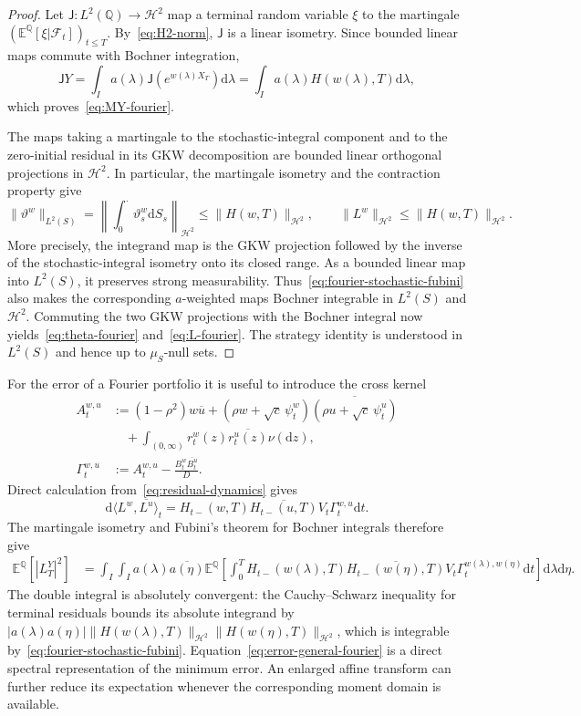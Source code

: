 \documentclass[11pt]{article}
\theoremstyle{definition}
\theoremstyle{remark}
\newcommand{\E}{\mathbb{E}}
\newcommand{\Q}{\mathbb{Q}}
\newcommand{\F}{\mathcal{F}}
\newcommand{\1}{\mathbf{1}}
\newcommand{\dd}{\mathrm{d}}
\begin{document}
\begin{proof}
Let $\mathsf J:L^2(\Q)\to\mathcal H^2$ map a terminal random variable $\xi$
to the martingale $(\E^\Q[\xi|\F_t])_{t\leq T}$. By~\eqref{eq:H2-norm},
$\mathsf J$ is a linear isometry. Since bounded linear
maps commute with Bochner integration,
\[
 \mathsf JY
 =\int_Ia(\lambda)\mathsf J(e^{w(\lambda)X_T})\dd\lambda
 =\int_Ia(\lambda)H(w(\lambda),T)\dd\lambda,
\]
which proves~\eqref{eq:MY-fourier}.

The maps taking a martingale to the stochastic-integral component and to the
zero-initial residual in its GKW decomposition are bounded linear orthogonal
projections in $\mathcal H^2$. In particular, the martingale isometry and the
contraction property give
\[
 \|\vartheta^{w}\|_{L^2(S)}
 =\left\|\int_0^\cdot\vartheta_s^{w}\dd S_s\right\|_{\mathcal H^2}
 \leq\|H(w,T)\|_{\mathcal H^2},
 \qquad
 \|L^{w}\|_{\mathcal H^2}
 \leq\|H(w,T)\|_{\mathcal H^2}.
\]
More precisely, the integrand map is the GKW projection followed by the
inverse of the stochastic-integral isometry onto its closed range. As a
bounded linear map into $L^2(S)$, it preserves strong measurability.
Thus~\eqref{eq:fourier-stochastic-fubini} also makes the corresponding
$a$-weighted maps Bochner integrable in $L^2(S)$ and $\mathcal H^2$.
Commuting the two GKW projections with the Bochner integral now
yields~\eqref{eq:theta-fourier} and~\eqref{eq:L-fourier}. The strategy
identity is understood in $L^2(S)$ and hence up to $\mu_S$-null sets.
\end{proof}

For the error of a Fourier portfolio it is useful to introduce the cross
kernel
\begin{align}
 A_t^{w,u}
 &:=(1-\rho^2)w\overline u
  +(\rho w+\sqrt c\,\psi_t^w)
    \overline{(\rho u+\sqrt c\,\psi_t^u)}
\nonumber\\
&\quad+\int_{(0,\infty)}r_t^w(z)\overline{r_t^u(z)}\nu(\dd z),
 \label{eq:cross-A}\\
\Gamma_t^{w,u}
 &:=A_t^{w,u}-\frac{B_t^w\overline{B_t^u}}{D}.
 \label{eq:cross-Gamma}
\end{align}
Direct calculation from~\eqref{eq:residual-dynamics} gives
\[
 \dd\langle L^w,\overline{L^u}\rangle_t
 =H_{t-}(w,T)\overline{H_{t-}(u,T)}
   V_t\Gamma_t^{w,u}\dd t.
\]
The martingale isometry and Fubini's theorem for Bochner integrals therefore
give
\begin{align}
 \E^\Q[|L_T^Y|^2]
 &=\int_I\int_Ia(\lambda)\overline{a(\eta)}
 \E^\Q\left[
  \int_0^T
    H_{t-}(w(\lambda),T)
    \overline{H_{t-}(w(\eta),T)}
    V_t\Gamma_t^{w(\lambda),w(\eta)}\dd t
 \right]\dd\lambda\dd\eta.
\label{eq:error-general-fourier}
\end{align}
The double integral is absolutely convergent: the Cauchy--Schwarz inequality
for terminal residuals bounds its absolute integrand by
$|a(\lambda)a(\eta)|
\|H(w(\lambda),T)\|_{\mathcal H^2}
\|H(w(\eta),T)\|_{\mathcal H^2}$, which is integrable
by~\eqref{eq:fourier-stochastic-fubini}.
Equation~\eqref{eq:error-general-fourier} is a direct spectral representation
of the minimum error. An enlarged affine transform can further reduce its
expectation whenever the corresponding moment domain is available.
\end{document}
